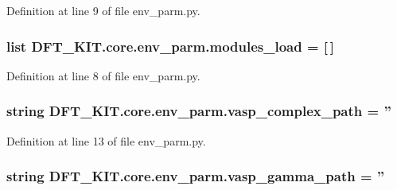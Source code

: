 Definition at line 9 of file env\+\_\+parm.\+py.

\hypertarget{namespace_d_f_t___k_i_t_1_1core_1_1env__parm_aa4e96fcf3d7fc30f9bc23ad6cbf9e0d2}{
\subsubsection[{modules\+\_\+load}]{\setlength{\rightskip}{0pt plus 5cm}list D\+F\+T\+\_\+\+K\+I\+T.\+core.\+env\+\_\+parm.\+modules\+\_\+load = \mbox{[}$\,$\mbox{]}}}\label{namespace_d_f_t___k_i_t_1_1core_1_1env__parm_aa4e96fcf3d7fc30f9bc23ad6cbf9e0d2}


Definition at line 8 of file env\+\_\+parm.\+py.

\hypertarget{namespace_d_f_t___k_i_t_1_1core_1_1env__parm_a01731a29ce04ed12b4752b0ed5e93b87}{
\subsubsection[{vasp\+\_\+complex\+\_\+path}]{\setlength{\rightskip}{0pt plus 5cm}string D\+F\+T\+\_\+\+K\+I\+T.\+core.\+env\+\_\+parm.\+vasp\+\_\+complex\+\_\+path = ''}}\label{namespace_d_f_t___k_i_t_1_1core_1_1env__parm_a01731a29ce04ed12b4752b0ed5e93b87}


Definition at line 13 of file env\+\_\+parm.\+py.

\hypertarget{namespace_d_f_t___k_i_t_1_1core_1_1env__parm_ab34b5a21dd0bed4aeefc358692f2d723}{
\subsubsection[{vasp\+\_\+gamma\+\_\+path}]{\setlength{\rightskip}{0pt plus 5cm}string D\+F\+T\+\_\+\+K\+I\+T.\+core.\+env\+\_\+parm.\+vasp\+\_\+gamma\+\_\+path = ''}}\label{namespace_d_f_t___k_i_t_1_1core_1_1env__parm_ab34b5a21dd0bed4aeefc358692f2d723}


